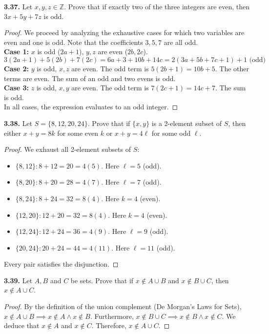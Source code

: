 \documentclass[11pt]{article}
\begin{document}
\textbf{3.37.} Let $x, y, z \in \mathbb{Z}$. Prove that if exactly two of the three integers are even, then $3x + 5y + 7z$ is odd.
\begin{proof}
We proceed by analyzing the exhaustive cases for which two variables are even and one is odd. Note that the coefficients $3, 5, 7$ are all odd. \\
\textbf{Case 1:} $x$ is odd ($2a+1$), $y, z$ are even ($2b, 2c$). 
\[ 3(2a+1) + 5(2b) + 7(2c) = 6a + 3 + 10b + 14c = 2(3a + 5b + 7c + 1) + 1 \text{ (odd)} \]
\textbf{Case 2:} $y$ is odd, $x, z$ are even. The odd term is $5(2b+1) = 10b+5$. The other terms are even. The sum of an odd and two evens is odd. \\
\textbf{Case 3:} $z$ is odd, $x, y$ are even. The odd term is $7(2c+1) = 14c+7$. The sum is odd. \\
In all cases, the expression evaluates to an odd integer.
\end{proof}

\textbf{3.38.} Let $S = \{8, 12, 20, 24\}$. Prove that if $\{x, y\}$ is a 2-element subset of $S$, then either $x + y = 8k$ for some even $k$ or $x + y = 4\ell$ for some odd $\ell$.
\begin{proof}
We exhaust all 2-element subsets of $S$:
\begin{itemize}
    \item $\{8, 12\}: 8+12=20 = 4(5)$. Here $\ell=5$ (odd).
    \item $\{8, 20\}: 8+20=28 = 4(7)$. Here $\ell=7$ (odd).
    \item $\{8, 24\}: 8+24=32 = 8(4)$. Here $k=4$ (even).
    \item $\{12, 20\}: 12+20=32 = 8(4)$. Here $k=4$ (even).
    \item $\{12, 24\}: 12+24=36 = 4(9)$. Here $\ell=9$ (odd).
    \item $\{20, 24\}: 20+24=44 = 4(11)$. Here $\ell=11$ (odd).
\end{itemize}
Every pair satisfies the disjunction.
\end{proof}

\textbf{3.39.} Let $A, B$ and $C$ be sets. Prove that if $x \notin A \cup B$ and $x \notin B \cup C$, then $x \notin A \cup C$.
\begin{proof}
By the definition of the union complement (De Morgan's Laws for Sets), $x \notin A \cup B \implies x \notin A \land x \notin B$. Furthermore, $x \notin B \cup C \implies x \notin B \land x \notin C$. We deduce that $x \notin A$ and $x \notin C$. Therefore, $x \notin A \cup C$. 
\end{proof}
\end{document}
